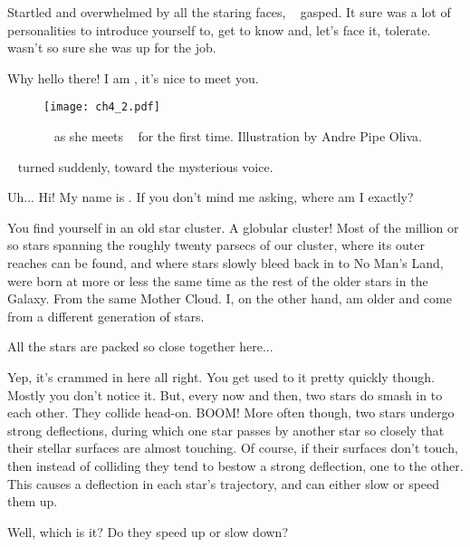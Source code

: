 \documentclass[main.tex]{subfiles}
\begin{document}
\par \nar Startled and overwhelmed by all the staring faces, \rmsterope~ gasped.  It sure was a lot of personalities to introduce yourself to, get to know and, let's face it, tolerate.  \rmsterope~ wasn't so sure she was up for the job.

\par \Enrico Why hello there!  I am \rmenrico, it's nice to meet you.

\begin{figure}
\texttt{[image: ch4\_2.pdf]}
\caption{\rmsterope~ as she meets \rmenrico~ for the first time.  Illustration by Andre Pipe Oliva.
\label{fig:fig1}}
\end{figure}

\par \nar \rmsterope~ turned suddenly, toward the mysterious voice.

\par \Sterope Uh...  Hi!  My name is \rmsterope.  If you don't mind me asking, where am I exactly?

\par \Enrico You find yourself in an old star cluster.  A globular cluster!  Most of the million or so stars spanning the roughly twenty parsecs of our cluster, where its outer reaches can be found, and where stars slowly bleed back in to No Man's Land, were born at more or less the same time as the rest of the older stars in the Galaxy.  From the same Mother Cloud.  I, on the other hand, am older and come from a different generation of stars.  

\par \Sterope All the stars are packed so close together here...

\par \Enrico Yep, it's crammed in here all right.  You get used to it pretty quickly though.  Mostly you don't notice it.  But, every now and then, two stars do smash in to each other.  They collide head-on.  BOOM!  More often though, two stars undergo strong deflections, during which one star passes by another star so closely that their stellar surfaces are almost touching.  Of course, if their surfaces don't touch, then instead of colliding they tend to bestow a strong deflection, one to the other.  This causes a deflection in each star's trajectory, and can either slow or speed them up.  

\par \Sterope Well, which is it?  Do they speed up or slow down?
\end{document}
